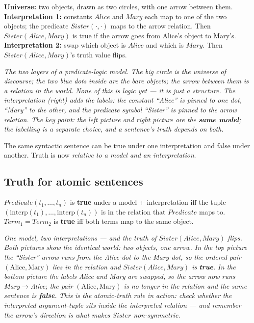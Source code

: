 \documentclass[11pt, a4paper]{article}
\begin{document}
\begin{exbox}
\textbf{Universe:} two objects, drawn as two circles, with one arrow between them.\\[0.3em]
\textbf{Interpretation 1:} constants $Alice$ and $Mary$ each map to one of the two objects; the predicate $Sister(\cdot,\cdot)$ maps to the arrow relation. Then $Sister(Alice, Mary)$ is true if the arrow goes from Alice's object to Mary's.\\[0.3em]
\textbf{Interpretation 2:} swap which object is $Alice$ and which is $Mary$. Then $Sister(Alice, Mary)$'s truth value flips.
\end{exbox}

\begin{center}

\footnotesize\textit{The two layers of a predicate-logic model. The big circle is the \emph{universe of discourse}; the two blue dots inside are the bare \emph{objects}; the arrow between them is a \emph{relation} in the world. None of this is logic yet — it is just a structure. The \emph{interpretation} (right) adds the labels: the constant ``Alice'' is pinned to one dot, ``Mary'' to the other, and the predicate symbol ``Sister'' is pinned to the arrow relation. The key point: the left picture and right picture are the \textbf{same model}; the labelling is a separate choice, and a sentence's truth depends on both.}
\end{center}

The same syntactic sentence can be true under one interpretation and false under another. Truth is now \emph{relative to a model and an interpretation}.

\subsection{Truth for atomic sentences}

\begin{defbox}
$Predicate(t_1, \dots, t_n)$ is \textbf{true} under a model + interpretation iff the tuple $(\text{interp}(t_1), \dots, \text{interp}(t_n))$ is in the relation that $Predicate$ maps to.\\[0.3em]
$Term_1 = Term_2$ is \textbf{true} iff both terms map to the same object.
\end{defbox}

\begin{center}

\footnotesize\textit{One model, two interpretations — and the truth of $Sister(Alice, Mary)$ flips. Both pictures show the identical world: two objects, one arrow. In the top picture the ``Sister'' arrow runs from the Alice-dot to the Mary-dot, so the ordered pair $(\text{Alice}, \text{Mary})$ lies in the relation and $Sister(Alice, Mary)$ is \textbf{true}. In the bottom picture the labels Alice and Mary are swapped, so the arrow now runs Mary$\to$Alice; the pair $(\text{Alice}, \text{Mary})$ is no longer in the relation and the same sentence is \textbf{false}. This is the atomic-truth rule in action: check whether the interpreted argument-tuple sits inside the interpreted relation — and remember the arrow's direction is what makes $Sister$ non-symmetric.}
\end{center}
\end{document}
